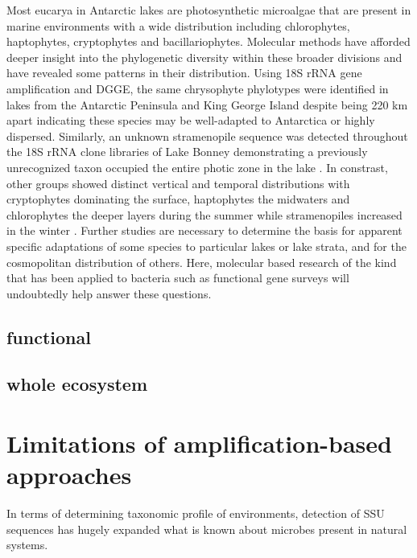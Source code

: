 \documentclass{book}
\begin{document}
Most eucarya in Antarctic lakes are photosynthetic microalgae that are present in marine environments with a wide distribution including chlorophytes, haptophytes, cryptophytes and bacillariophytes.
Molecular methods have afforded deeper insight into the phylogenetic diversity within these broader divisions and have revealed some patterns in their distribution. 
Using 18S rRNA gene amplification and DGGE, the same chrysophyte phylotypes were identified in lakes from the Antarctic Peninsula and King George Island 
despite being 220 km apart \cite{Unrein2005} indicating these species may be well-adapted to Antarctica or highly dispersed.
Similarly, an unknown stramenopile sequence was detected throughout the 18S rRNA clone libraries of Lake Bonney 
demonstrating a previously unrecognized taxon occupied the entire photic zone in the lake \cite{Bielewicz2011}. 
In constrast, other groups showed distinct vertical and temporal distributions with cryptophytes dominating the surface, 
haptophytes the midwaters and chlorophytes the deeper layers during the summer while stramenopiles increased in the winter \cite{Bielewicz2011}. 
Further studies are necessary to determine the basis for apparent specific adaptations of some species to particular lakes or lake strata, and for the cosmopolitan distribution of others.
Here, molecular based research of the kind that has been applied to bacteria such as functional gene surveys will undoubtedly help answer these questions.

\subsection{functional}

\subsection{whole ecosystem}

\section{Limitations of amplification-based approaches}

In terms of determining taxonomic profile of environments, detection of SSU sequences has hugely expanded what is known about microbes present in natural systems.
\end{document}
